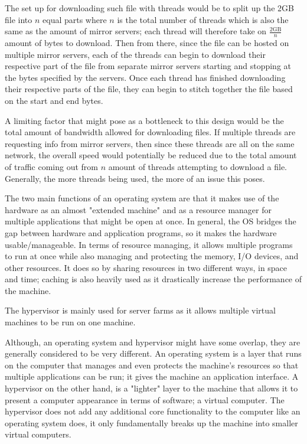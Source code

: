	The set up for downloading such file with threads would be to split up the 2GB file into $n$ equal parts where $n$ is the total number of threads which is also the same as the amount of mirror servers; each thread will therefore take on $\frac{2\text{GB}}{n}$ amount of bytes to download. Then from there, since the file can be hosted on multiple mirror servers, each of the threads can begin to download their respective part of the file from separate mirror servers starting and stopping at the bytes specified by the servers. Once each thread has finished downloading their respective parts of the file, they can begin to stitch together the file based on the start and end bytes.\par

	A limiting factor that might pose as a bottleneck to this design would be the total amount of bandwidth allowed for downloading files. If multiple threads are requesting info from mirror servers, then since these threads are all on the same network, the overall speed would potentially be reduced due to the total amount of traffic coming out from $n$ amount of threads attempting to download a file. Generally, the more threads being used, the more of an issue this poses.\par

\newpage


	The two main functions of an operating system are that it makes use of the hardware as an almost "extended machine" and as a resource manager for multiple applications that might be open at once. In general, the OS bridges the gap between hardware and application programs, so it makes the hardware usable/manageable. In terms of resource managing, it allows multiple programs to run at once while also managing and protecting the memory, I/O devices, and other resources. It does so by sharing resources in two different ways, in space and time; caching is also heavily used as it drastically increase the performance of the machine.\par

	The hypervisor is mainly used for server farms as it allows multiple virtual machines to be run on one machine.\par

	Although, an operating system and hypervisor might have some overlap, they are generally considered to be very different. An operating system is a layer that runs on the computer that manages and even protects the machine's resources so that multiple applications can be run; it gives the machine an application interface. A hypervisor on the other hand, is a "lighter" layer to the machine that allows it to present a computer appearance in terms of software; a virtual computer. The hypervisor does not add any additional core functionality to the computer like an operating system does, it only fundamentally breaks up the machine into smaller virtual computers.\par


